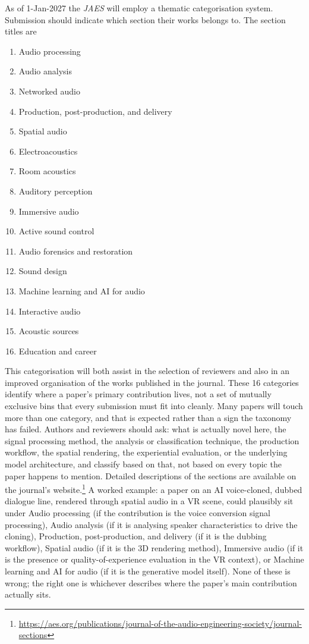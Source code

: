 \documentclass[fleqn,draft]{jaes}
\begin{document}
As of 1-Jan-2027 the \emph{JAES} will employ a thematic categorisation system. Submission should indicate which section their works belongs to. The section titles are 
\begin{enumerate}
    \item Audio processing
    \item Audio analysis
    \item Networked audio
    \item Production, post-production, and delivery
    \item Spatial audio
    \item Electroacoustics
    \item Room acoustics
    \item Auditory perception
    \item Immersive audio
    \item Active sound control
    \item Audio forensics and restoration
    \item Sound design
    \item Machine learning and AI for audio
    \item Interactive audio
    \item Acoustic sources
    \item Education and career
\end{enumerate}
This categorisation will both assist in the selection of reviewers and also in an improved organisation of the works published in the journal. 
These 16 categories identify where a paper's primary contribution lives, not a set of mutually exclusive bins that every submission must fit into cleanly. Many papers will touch more than one category, and that is expected rather than a sign the taxonomy has failed. Authors and reviewers should ask: what is actually novel here, the signal processing method, the analysis or classification technique, the production workflow, the spatial rendering, the experiential evaluation, or the underlying model architecture, and classify based on that, not based on every topic the paper happens to mention. Detailed descriptions of the sections are available on the journal's website.\footnote{\url{https://aes.org/publications/journal-of-the-audio-engineering-society/journal-sections}}
A worked example: a paper on an AI voice-cloned, dubbed dialogue line, rendered through spatial audio in a VR scene, could plausibly sit under Audio processing (if the contribution is the voice conversion signal processing), Audio analysis (if it is analysing speaker characteristics to drive the cloning), Production, post-production, and delivery (if it is the dubbing workflow), Spatial audio (if it is the 3D rendering method), Immersive audio (if it is the presence or quality-of-experience evaluation in the VR context), or Machine learning and AI for audio (if it is the generative model itself). None of these is wrong; the right one is whichever describes where the paper's main contribution actually sits.
\end{document}
